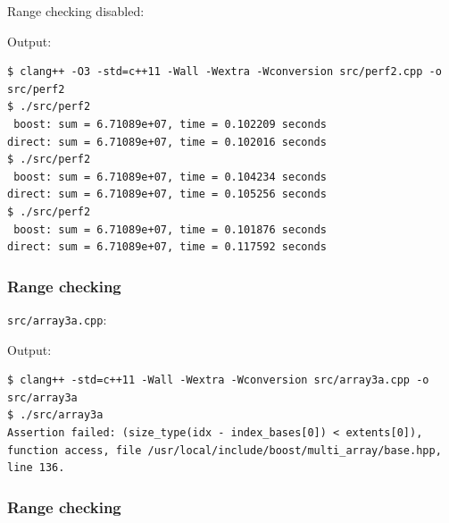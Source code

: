 \documentclass[12pt,letterpaper,twoside]{article}
\begin{document}
Range checking disabled:

Output:

\begin{verbatim}
$ clang++ -O3 -std=c++11 -Wall -Wextra -Wconversion src/perf2.cpp -o src/perf2
$ ./src/perf2
 boost: sum = 6.71089e+07, time = 0.102209 seconds
direct: sum = 6.71089e+07, time = 0.102016 seconds
$ ./src/perf2
 boost: sum = 6.71089e+07, time = 0.104234 seconds
direct: sum = 6.71089e+07, time = 0.105256 seconds
$ ./src/perf2
 boost: sum = 6.71089e+07, time = 0.101876 seconds
direct: sum = 6.71089e+07, time = 0.117592 seconds
\end{verbatim}

\hypertarget{range-checking}{%
\subsubsection{Range checking}\label{range-checking}}

\texttt{src/array3a.cpp}:

\begin{Shaded}
\begin{Highlighting}[]

  \NormalTok{, }\NormalTok{extents[}\NormalTok{][}\NormalTok{]);}
\NormalTok{  a[}\NormalTok{][}\NormalTok{] = }\NormalTok{;}
   \NormalTok{;}
\NormalTok{\}}
\end{Highlighting}
\end{Shaded}

Output:

\begin{verbatim}
$ clang++ -std=c++11 -Wall -Wextra -Wconversion src/array3a.cpp -o src/array3a
$ ./src/array3a
Assertion failed: (size_type(idx - index_bases[0]) < extents[0]), function access, file /usr/local/include/boost/multi_array/base.hpp, line 136.
\end{verbatim}

\hypertarget{range-checking-1}{%
\subsubsection{Range checking}\label{range-checking-1}}
\end{document}
